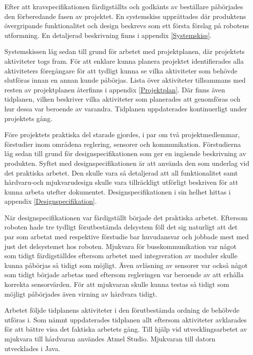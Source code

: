 \documentclass[11pt]{article}
\begin{document}
\begin{flushleft}
Efter att kravspecifikationen färdigställts och godkänts av beställare påbörjades den förberedande fasen av projektet. En systemskiss upprättades där produktens övergripande funktionalitet och design beskrevs som ett första förslag på robotens utformning. En detaljerad beskrivning finns i appendix \ref{Systemskiss}. 

Systemskissen låg sedan till grund för arbetet med projektplanen, där projektets aktiviteter togs fram. För att enklare kunna planera projektet identifierades alla aktiviteters föregångare för att tydligt kunna se vilka aktiviteter som behövde slutföras innan en annan kunde påbörjas. Lista över aktiviteter tillsammans med resten av projektplanen återfinns i appendix \ref{Projektplan}. Där finns även tidplanen, vilken beskriver vilka aktiviteter som planerades att genomföras och hur dessa var beroende av varandra. Tidplanen uppdaterades kontinuerligt under projektets gång.

Före projektets praktiska del starade gjordes, i par om två projektmedlemmar, förstudier inom områdena reglering, sensorer och kommunikation. Förstudierna låg sedan till grund för designspecifikationen som ger en ingående beskrivning av produkten. Syftet med designspecifikationen är att använda den som underlag vid det praktiska arbetet. Den skulle vara så detaljerad att all funktionalitet samt hårdvaru-och mjukvarudesign skulle vara tillräckligt utförligt beskriven för att kunna arbeta utefter dokumentet. Designspecifikationen i sin helhet hittas i appendix \ref{Designspecifikation}. 

När designspecifikationen var färdigställt började det praktiska arbetet. Eftersom roboten hade tre tydligt förutbestämda delsystem föll det sig naturligt att det par som arbetat med respektive förstudie bar huvudansvar och jobbade mest med just det delsystemet hos roboten. Mjukvara för busskommunikation var något som tidigt färdigställdes eftersom arbetet med integreration av moduler skulle kunna påbörjas så tidigt som möjligt. Även avläsning av sensorer var också något som tidigt började arbetas med eftersom regleringen var beroende av att erhålla korrekta sensorvärden. För att mjukvaran skulle kunna testas så tidigt som möjligt påbörjades även virning av hårdvara tidigt. 

Arbetet följde tidplanens aktiviteter i den förutbestämda ordning de behöbvde utföras i. Som nämnt uppdaterades tidplanen allt eftersom aktiviteter avklarades för att bättre visa det faktiska arbetets gång. Till hjälp vid utvecklingsarbetet av mjukvara till hårdvaran användes Atmel Studio. Mjukvaran till datorn utvecklades i Java. 


\end{flushleft}
\end{document}
